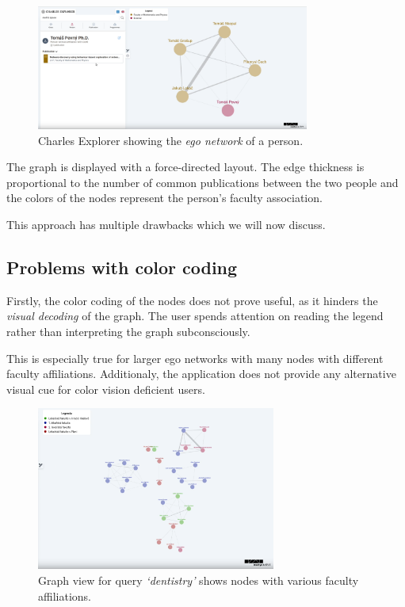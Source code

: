 \begin{figure}[ht!]
    \captionsetup{width=.9\linewidth}
    \includegraphics[width=0.8\textwidth]{../img/charles-explorer-old-view.png}
    \centering
    \caption{Charles Explorer showing the \textit{ego network} of a person.}
\end{figure}

The graph is displayed with a force-directed layout. The edge thickness is proportional to the number of common publications between 
the two people and the colors of the nodes represent the person's faculty association.

This approach has multiple drawbacks which we will now discuss.

\subsection{Problems with color coding} \label{sec:color-coding}

Firstly, the color coding of the nodes does not prove useful, as it hinders the \textit{visual decoding} of the graph.
The user spends attention on reading the legend rather than interpreting the graph subconsciously.

This is especially true for larger ego networks with many nodes with different faculty affiliations. 
Additionaly, the application does not provide any alternative visual cue for color vision deficient users.

\begin{figure}[ht!]
    \captionsetup{width=.9\linewidth}
    \includegraphics[width=0.7\textwidth]{../img/color-coding.png}
    \centering
    \caption{Graph view for query \textit{`dentistry'} shows nodes with various faculty affiliations.}
\end{figure}

